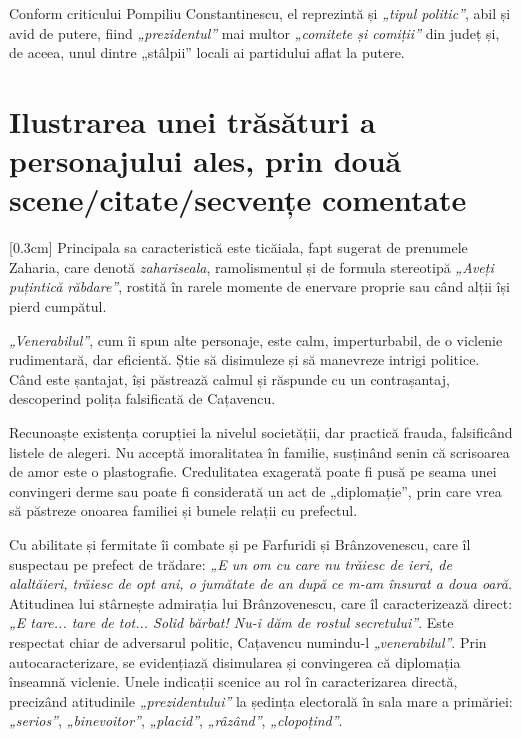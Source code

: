 \documentclass[
12pt,                        %
a4paper                      %
]{article}
\begin{document}
Conform criticului Pompiliu Constantinescu, el reprezintă și \textit{„tipul politic”}, abil și avid de putere, fiind \textit{„prezidentul”} mai multor \textit{„comitete și comiții”} din județ și, de aceea, unul dintre „stâlpii” locali ai partidului aflat la putere.

\section{Ilustrarea unei trăsături a personajului ales, prin două sce\-ne/ci\-ta\-te/sec\-ven\-țe comentate}

[0.3cm]
Principala sa caracteristică este ticăiala, fapt sugerat de prenumele Zaharia, care denotă \textit{zahariseala}, ramolismentul și de formula stereotipă \textit{„Aveți puțintică răbdare”}, rostită în rarele momente de enervare proprie sau când alții își pierd cumpătul.

\textit{„Venerabilul”}, cum îi spun alte personaje, este calm, imperturbabil, de o viclenie rudimentară, dar eficientă. Știe să disimuleze și să manevreze intrigi politice. Când este șantajat, își păstrează calmul și răspunde cu un contrașantaj, descoperind polița falsificată de Cațavencu.

Recunoaște existența corupției la nivelul societății, dar practică frauda, falsificând listele de alegeri. Nu acceptă imoralitatea în familie, susținând senin că scrisoarea de amor este o plastografie. Credulitatea exagerată poate fi pusă pe seama unei convingeri derme sau poate fi considerată un act de „diplomație”, prin care vrea să păstreze onoarea familiei și bunele relații cu prefectul.

Cu abilitate și fermitate îi combate și pe Farfuridi și Brânzovenescu, care îl suspectau pe prefect de trădare: \textit{„E un om cu care nu trăiesc de ieri, de alaltăieri, trăiesc de opt ani, o jumătate de an după ce m-am însurat a doua oară.} Atitudinea lui stârnește admirația lui Brânzovenescu, care îl caracterizează direct: \textit{„E tare... tare de tot... Solid bărbat! Nu-i dăm de rostul secretului”}. Este respectat chiar de adversarul politic, Cațavencu numindu-l \textit{„venerabilul”}. Prin autocaracterizare, se evidențiază disimularea și convingerea că diplomația înseamnă viclenie. Unele indicații scenice au rol în caracterizarea directă, precizând atitudinile \textit{„prezidentului”} la ședința electorală în sala mare a primăriei: \textit{„serios”}, \textit{„binevoitor”}, \textit{„placid”}, \textit{„râzând”}, \textit{„clopoțind”}.
\end{document}
